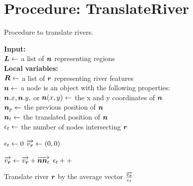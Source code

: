 \section{Procedure: TranslateRiver}

\begin{algorithm}[H]
    \caption{Procedure to translate rivers.}\label{alg:TranslateRiver}
    \textbf{Input:} \\
    $ \bm{L} \gets $ a list of $ \bm{n} $ representing regions \\

    \textbf{Local variables:} \\
    $ \bm{R} \gets $ a list of $ \bm{r} $ representing river features \\
    $ \bm{n} \gets $ a node is an object with the following properties: \\
    \-\hspace{1em} $ \bm{n}.x, \bm{n}.y, $ or $ \bm{n}(x,y) \gets $ the x and y coordinates of $ \bm{n} $ \\
    \-\hspace{1em} $ \bm{n}_{p} \gets $ the previous position of $ \bm{n} $ \\
    \-\hspace{1em} $ \bm{n}_t \gets $ the translated position of $ \bm{n} $ \\
    $ \epsilon_{t} \gets $ the number of nodes intersecting $ \bm{r} $  \\

    \begin{algorithmic}[1]
        \ForEach {$ \river \in \riverList $}
        \State $ \epsilon_{t} \gets 0 $
        \State $ \protect\overrightarrow{v_{\bm{r}}} \gets (0,0) $ 
        \ForEach {$ \node \in \nodeList $}

        \State $ \protect\overrightarrow{v_{\bm{r}}} \gets \protect\overrightarrow{v_{\bm{r}}} + \protect\overrightarrow{\bm{n}\bm{n}_t}$
        \State $ \epsilon_{t} ++ $
        \EndIf

        \EndIf

        \EndFor

        \State Translate river $ \bm{r} $ by the average vector $ \frac{\protect\overrightarrow{v_{\bm{r}}}}{\epsilon_{t}} $
        \EndFor

        \EndProcedure
    \end{algorithmic}
\end{algorithm}

